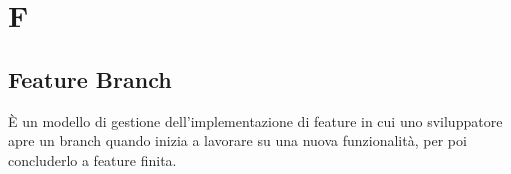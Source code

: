 \section{F}
	\subsection{Feature Branch}
		È un modello di gestione dell'implementazione di  feature in cui uno sviluppatore apre un branch quando inizia a lavorare su una nuova funzionalità, per poi concluderlo a feature finita.
\newpage